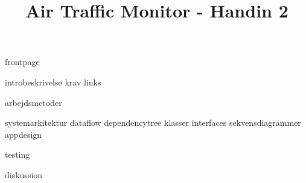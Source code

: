 \documentclass[a4paper]{article}								%
\title{Air Traffic Monitor - Handin 2}
\begin{document}

	{frontpage}

	\tableofcontents\thispagestyle{fancy} \newpage
	
	
	{introbeskrivelse}
	{krav}
	{links}

	{arbejdsmetoder}

	{systemarkitektur}
	{dataflow}
	{dependencytree}
	{klasser}
	{interfaces}
	{sekvensdiagrammer}
	{appdesign}

	{testing}

	{diskussion}
	

\end{document}
